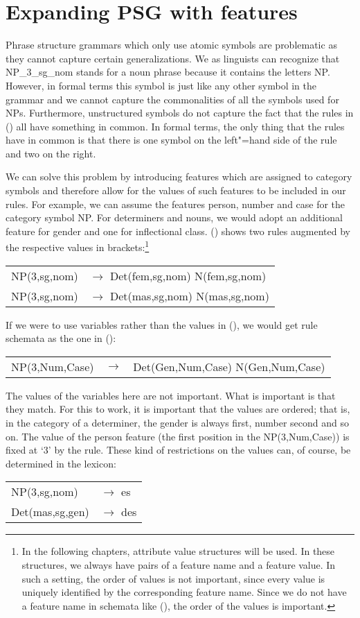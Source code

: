\section{Expanding PSG with features}
\label{sec-PSG-Merkmale}

Phrase structure grammars which only use atomic symbols are problematic as they cannot capture certain generalizations.
We as linguists can recognize that NP\_3\_sg\_nom stands for a noun phrase because it contains the letters NP. 
However, in formal terms this symbol is just like any other symbol in the grammar and we cannot capture the commonalities
of all the symbols used for NPs. Furthermore, unstructured symbols do not capture the fact that the rules in () 
all have something in common. In formal terms, the only thing that the rules have in common is that there is one symbol on the
left"=hand side of the rule and two on the right.

We can solve this problem by introducing features which are assigned to category symbols and therefore allow for the values of
such features to be included in our rules. For example, we can assume the features person, number and case for the category
symbol NP. For determiners and nouns, we would adopt an additional feature for gender and one for
inflectional class. () shows two rules augmented by the respective values in brackets:\footnote{%
  In the following chapters, attribute value structures will be used. In these structures, we always
have pairs of a feature name and a feature value. In such a setting, the order of values is not
important, since every value is uniquely identified by the corresponding feature name. Since we do not have a feature name
in schemata like (), the order of the values is important.
}

\ea
\begin{tabular}[t]{@{}l@{ }l}
NP(3,sg,nom)  & $\to$ Det(fem,sg,nom) N(fem,sg,nom)\\
NP(3,sg,nom)  & $\to$ Det(mas,sg,nom) N(mas,sg,nom)\\
\end{tabular}
\z
\largerpage
If we were to use variables rather than the values in (), we would get rule schemata as the
one in ():
\ea
\label{Regel-mit-Variablen}
\begin{tabular}[t]{@{}l@{ }l@{ }l}
NP({3},{Num},{Case}) & $\to$ & Det(Gen,{Num},{Case}) N(Gen,{Num},{Case})\\
\end{tabular}
\z
The values of the variables here are not important. What is important is that they match. For this
to work, it is important that the values are ordered; that is, in the category of a determiner, the gender is always first, number
second and so on. The value of the person feature (the first position in the NP(3,Num,Case)) is fixed at `3' by the rule. These
kind of restrictions on the values can, of course, be determined in the lexicon: 
\ea
\begin{tabular}[t]{@{}l@{ }l}
NP(3,sg,nom)  & $\to$ es\\
Det(mas,sg,gen)  & $\to$ des\\
\end{tabular}
\z

